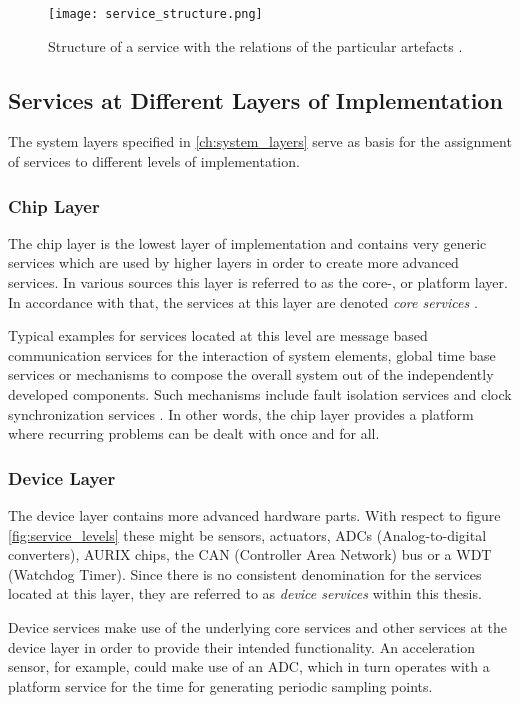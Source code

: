 \begin{figure}[!htbp]
\centering
\texttt{[image: service\_structure.png]}
\caption{Structure of a service with the relations of the particular artefacts \cite[p.45]{krafzig}.}
\label{fig:service}
\end{figure}




\subsection{Services at Different Layers of Implementation}
\label{ch:service_layers}
The system layers specified in \ref{ch:system_layers} serve as basis for the assignment of services to different levels of implementation.

\subsubsection{Chip Layer}
The chip layer is the lowest layer of implementation and contains very generic services which are used by higher layers in order to create more advanced services. In various sources this layer is referred to as the core-, or platform layer. In accordance with that, the services at this layer are denoted \emph{core services} \cite[p.44]{genesys}.

Typical examples for services located at this level are message based communication services for the interaction of system elements, global time base services or mechanisms to compose the overall system out of the independently developed components. Such mechanisms include fault isolation services and clock synchronization services \cite[p.7-12]{genesys}. In other words, the chip layer provides a platform where recurring problems can be dealt with once and for all.

\subsubsection{Device Layer}
The device layer contains more advanced hardware parts. With respect to figure \ref{fig:service_levels} these might be sensors, actuators, ADCs (Analog-to-digital converters), AURIX chips, the CAN (Controller Area Network) bus or a WDT (Watchdog Timer). Since there is no consistent denomination for the services located at this layer, they are referred to as \emph{device services} within this thesis.

Device services make use of the underlying core services and other services at the device layer in order to provide their intended functionality. An acceleration sensor, for example, could make use of an ADC, which in turn operates with a platform service for the time for generating periodic sampling points.

